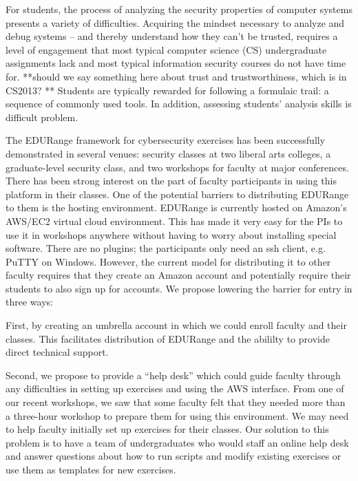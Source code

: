 For students, the process of analyzing the security
properties of computer systems presents a variety of difficulties.
Acquiring the mindset necessary to analyze and debug systems -- and
thereby understand how they can't be trusted, requires a level
of engagement that most typical computer science (CS) undergraduate assignments lack and
most typical information security courses do not have time for.  **should we say something
here about trust and trustworthiness, which is in CS2013? **
Students are typically rewarded for following a formulaic trail: a sequence
of commonly used tools.  In addition, assessing students' analysis skills is  difficult 
problem.


The EDURange framework for cybersecurity exercises has been successfully demonstrated 
in several venues: security classes at two liberal arts colleges, a graduate-level security class, and
two workshops for faculty at major conferences.  There has been strong interest on the part of
faculty participants in using this platform in their classes.  
One of the potential barriers to distributing EDURange to them is the hosting environment.
EDURange is currently hosted on
Amazon's AWS/EC2 virtual cloud environment.  This has made it very easy for the PIs to use it in 
workshops anywhere without having to worry about installing special software.  There are no plugins;
the participants only need an ssh client, e.g. PuTTY on Windows.  However, the current 
model for distributing
it to other faculty requires that they create an Amazon account and potentially require their students
to also sign up for accounts.  We propose lowering the barrier for entry in three ways:

First, by creating an umbrella account in 
which we could enroll faculty and their classes.  This facilitates distribution of EDURange
and the abililty to provide direct 
technical support.  

Second,
we propose to provide a ``help desk'' which could guide faculty through any difficulties in setting up 
exercises and using the AWS interface.  From one of our recent workshops, we saw that 
some faculty felt that they needed more than a three-hour workshop to prepare them for using this
environment.  We may need to help faculty initially set up exercises 
for their classes.  Our solution to this problem is  to have a team of undergraduates who would staff 
an online help desk
and answer questions about how to run scripts and modify existing exercises or use them as 
templates for new exercises.

